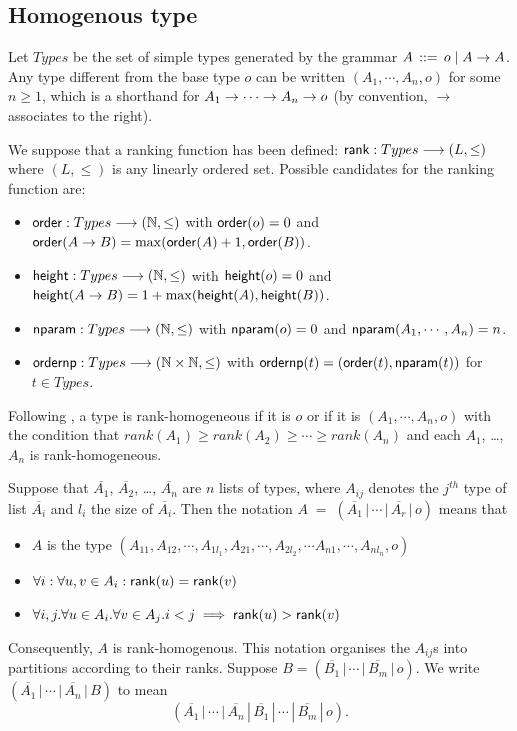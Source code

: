 \subsection{Homogenous type}
\label{sec:homotypes}

Let $Types$ be the set of simple types generated by the grammar $A
\, ::= \, o \; | \; A \rightarrow A$. Any type different from the base
type $o$ can be written $(A_1, \cdots, A_n, o)$ for some $n \geq 1$,
which is a shorthand for $A_1 \rightarrow \cdots \rightarrow A_n \rightarrow o$ (by
convention, $\rightarrow$ associates to the right).

We suppose that a ranking function has been defined: ${\sf rank} :
Types \longrightarrow (L, \leq)$ where $(L, \leq)$ is any linearly ordered
set. Possible candidates for the ranking function are:
\begin{itemize}
\item ${\sf order} : Types \longrightarrow (\mathbb{N},\leq)$ with ${\sf order}(o) = 0$
and ${\sf order}(A \rightarrow B) = \max({\sf order}(A)+1, {\sf order}(B))$.
\item ${\sf height} : Types \longrightarrow (\mathbb{N},\leq)$ with ${\sf height}(o) = 0$
and ${\sf height}(A \rightarrow B) = 1 + \max({\sf height}(A), {\sf height}(B))$.
\item ${\sf nparam} : Types \longrightarrow (\mathbb{N},\leq)$ with ${\sf nparam}(o) = 0$
and ${\sf nparam}(A_1, \cdots, A_n) = n$.
\item ${\sf ordernp} : Types \longrightarrow (\mathbb{N} \times \mathbb{N},\leq)$ with $ {\sf ordernp} (t)  = ({\sf order}(t), {\sf nparam}(t))$ for $t \in Types$.
\end{itemize}


Following \cite{KNU02}, a type is rank-homogeneous if it is $o$ or
if it is $(A_1, \cdots, A_n, o)$ with the condition that $rank(A_1)
\geq rank(A_2)\geq \cdots \geq rank(A_n)$ and each $A_1$, \ldots,
$A_n$ is rank-homogeneous.



Suppose that $\overline{A_1}$, $\overline{A_2}$, \ldots,
$\overline{A_n}$ are $n$ lists of types, where $A_{ij}$ denotes the
$j^{th}$ type of list $\overline{A_i}$ and $l_i$ the size of
$\overline{A_i}$. Then the notation $A \; = \; (\overline{A_1} \, |
\, \cdots \, | \, \overline{A_r} \, | \, o)$ means that
\begin{itemize}
  \item $A$ is the type $(A_{11},A_{12},\cdots, A_{1l_1}, A_{21}, \cdots,A_{2l_2}, \cdots A_{n1},\cdots, A_{nl_n},o)$
  \item $\forall i: \forall u,v \in A_i : {\sf rank}(u) = {\sf rank}(v) $
  \item $\forall i,j . \forall u \in A_i . \forall v \in A_j . i<j \implies {\sf rank}(u) >
   {\sf rank}(v) $
\end{itemize}
Consequently, $A$ is rank-homogenous. This notation organises the
$A_{ij}$s into partitions according to their ranks. Suppose $B =
(\overline{B_1} \, | \, \cdots \, | \, \overline{B_m} \, | \, o)$.
We write $(\overline{A_1} \, | \, \cdots \, | \, \overline{A_n} \, |
\, {B})$ to mean
\[(\overline{A_1} \, | \, \cdots \, | \, \overline{A_n} \, | \,
\overline{B_1} \, | \, \cdots \, | \, \overline{B_m} \, | \, o).\]



